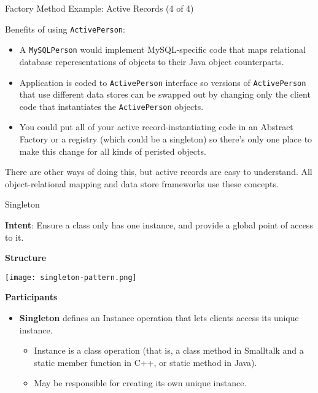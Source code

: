 \documentclass{beamer}
\begin{document}
\begin{frame}[fragile]{Factory Method Example: Active Records (4 of 4)}


Benefits of using {\tt ActivePerson}:
\begin{itemize}
\item A {\tt MySQLPerson} would implement MySQL-specific code that maps relational database reperesentations of objects to their Java object counterparts.
\item Application is coded to {\tt ActivePerson} interface so versions of {\tt ActivePerson} that use different data stores can be swapped out by changing only the client code that instantiates the {\tt ActivePerson} objects.
\item You could put all of your active record-instantiating code in an Abstract Factory or a registry (which could be a singleton) so there's only one place to make this change for all kinds of peristed objects.
\end{itemize}

There are other ways of doing this, but active records are easy to understand.  All object-relational mapping and data store frameworks use these concepts.

\end{frame}



\begin{frame}[fragile]{Singleton}


{\bf Intent}: Ensure a class only has one instance, and provide a global point of access to it.

{\bf Structure}
\vspace{-.15in}
\begin{center}
\texttt{[image: singleton-pattern.png]}\\
\end{center}
\vspace{-.15in}
{\bf Participants}
\begin{itemize}
\item {\bf Singleton} defines an Instance operation that lets clients access its unique instance.
\begin{itemize}
\item Instance is a class operation (that is, a class method in Smalltalk and a static member function in C++, or static method in Java).
\item May be responsible for creating its own unique instance.
\end{itemize}
\end{itemize}


\end{frame}
\end{document}
